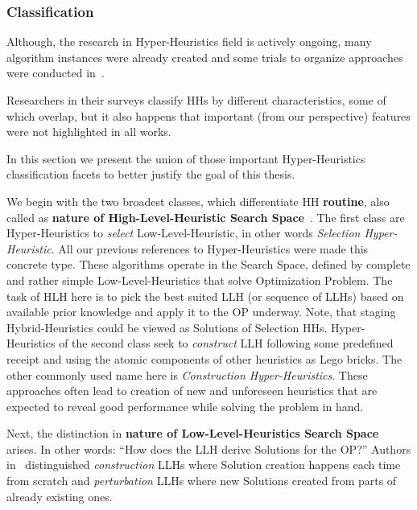 \subsubsection{Classification}
Although, the research in Hyper-Heuristics field is actively ongoing, many algorithm instances were already created and some trials to organize approaches were conducted in~\cite{ryser2014review,drake2019recent,burke2019classification}.

Researchers in their surveys classify HHs by different characteristics, some of which overlap, but it also happens that important (from our perspective) features were not highlighted in all works. 

In this section we present the union of those important Hyper-Heuristics classification facets to better justify the goal of this thesis.

We begin with the two broadest classes, which differentiate HH \textbf{routine}, also called as \textbf{nature of High-Level-Heuristic Search Space}~\cite{burke2013hyper,burke2019classification,drake2019recent}.
The first class are Hyper-Heuristics to \textit{select} Low-Level-Heuristic, in other words \textit{Selection Hyper-Heuristic}. All our previous references to Hyper-Heuristics were made this concrete type. These algorithms operate in the Search Space, defined by complete and rather simple Low-Level-Heuristics that solve Optimization Problem. The task of HLH here is to pick the best suited LLH (or sequence of LLHs) based on available prior knowledge and apply it to the OP underway. Note, that staging Hybrid-Heuristics could be viewed as Solutions of Selection HHs.
Hyper-Heuristics of the second class seek to \textit{construct} LLH following some predefined receipt and using the atomic components of other heuristics as Lego bricks. The other commonly used name here is \textit{Construction Hyper-Heuristics}. These approaches often lead to creation of new and unforeseen heuristics that are expected to reveal good performance while solving the problem in hand.

Next, the distinction in \textbf{nature of Low-Level-Heuristics Search Space} arises. 
In other words: ``How does the LLH derive Solutions for the OP?'' Authors in~\cite{burke2013hyper,burke2019classification,drake2019recent} distinguished \textit{construction} LLHs where Solution creation happens each time from scratch and \textit{perturbation} LLHs where new Solutions created from parts of already existing ones.

